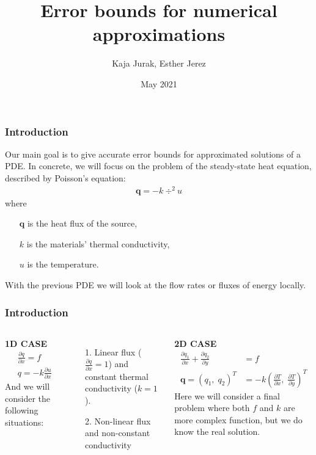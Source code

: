 \documentclass[t]{beamer}
\title{Error bounds for numerical approximations}
\author[MAT264] 
{Kaja Jurak, Esther Jerez}
\institute[UIB]
{
	Faculty of Mathematics\\
	University of Bergen
	
}
\date[2021]
{May 2021}
\begin{document}
	\frame{\titlepage}
	\begin{frame}
	\frametitle{Introduction}
	Our main goal is to give accurate error bounds for approximated solutions of a PDE. In concrete, we will focus on the problem of the steady-state heat equation, described by  \alert{Poisson's equation}:
	\begin{align*}
	\bm{q} = -k \div ^2 u
	\end{align*}
	where 
	\begin{enumerate}
		\item[] $\bm{q}$ is the heat flux of the source,
		\item[] $k$ is the materials' thermal conductivity,
		\item[] $u$ is the temperature.
	\end{enumerate}
	With the previous PDE we will look at the flow rates or fluxes of energy locally. \\
	
	
\end{frame}

\begin{frame}
\frametitle{Introduction}
\begin{columns}[t]
	\textbf{1D CASE}
	\begin{align*}
	&\frac{\partial q}{\partial x} = f \\
	&q = -k \frac{\partial u}{\partial x} 
	\end{align*}
	And we will consider the following situations:
	\begin{itemize}
		\item[1.] Linear flux ($\frac{\partial q}{\partial x} = 1$) and constant thermal conductivity ($k=1$).
		\item[2.] Non-linear flux and non-constant conductivity
	\end{itemize}
	
	\textbf{2D CASE} \\
	\begin{align*}
	\frac{\partial q_1}{\partial x} + \frac{\partial q_2}{\partial y}  &= f \\
	\bm{q} = (q_1,\; q_2)^T  &= -k \left( \frac{\partial T}{\partial x} ,\; \frac{\partial T}{\partial y}\right)^T
	\end{align*}
	Here we will consider a final problem where both $f$ and $k$ are more complex function, but we do know the real solution.
\end{columns}        
\end{frame}
\end{document}
